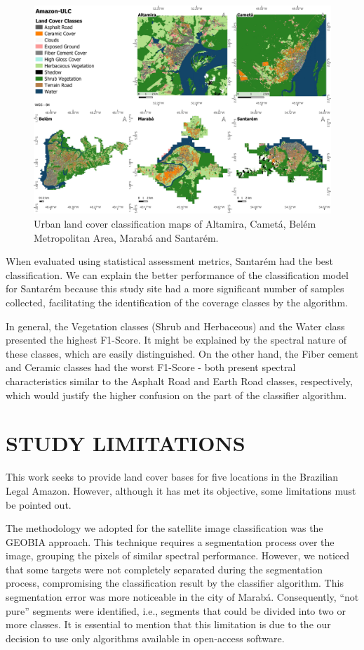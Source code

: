 \documentclass[preprint, 3p,
authoryear]{elsarticle} %
\begin{document}
\begin{figure}
\includegraphics[width=.8\linewidth]{images/ULC_Legend_v2-tile} \caption{\label{fig:fig-land-cover-classes}Urban land cover classification maps of Altamira, Cametá, Belém Metropolitan Area, Marabá and Santarém.}\label{fig:fig-2}
\end{figure}

When evaluated using statistical assessment metrics, Santarém had the
best classification. We can explain the better performance of the
classification model for Santarém because this study site had a more
significant number of samples collected, facilitating the identification
of the coverage classes by the algorithm.

In general, the Vegetation classes (Shrub and Herbaceous) and the Water
class presented the highest F1-Score. It might be explained by the
spectral nature of these classes, which are easily distinguished. On the
other hand, the Fiber cement and Ceramic classes had the worst F1-Score
- both present spectral characteristics similar to the Asphalt Road and
Earth Road classes, respectively, which would justify the higher
confusion on the part of the classifier algorithm.

\hypertarget{study-limitations}{%
\section{STUDY LIMITATIONS}\label{study-limitations}}

This work seeks to provide land cover bases for five locations in the
Brazilian Legal Amazon. However, although it has met its objective, some
limitations must be pointed out.

The methodology we adopted for the satellite image classification was
the GEOBIA approach. This technique requires a segmentation process over
the image, grouping the pixels of similar spectral performance. However,
we noticed that some targets were not completely separated during the
segmentation process, compromising the classification result by the
classifier algorithm. This segmentation error was more noticeable in the
city of Marabá. Consequently, ``not pure'' segments were identified,
i.e., segments that could be divided into two or more classes. It is
essential to mention that this limitation is due to the our decision to
use only algorithms available in open-access software.
\end{document}
